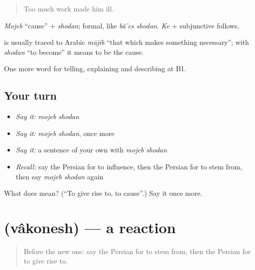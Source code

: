 \begin{quote}
Too much work made him ill.
\end{quote}

\emph{Mojeb} \textquotedblleft{}cause\textquotedblright{} + \emph{shodan}; formal, like \emph{bâ'es shodan}. \emph{Ke} + subjunctive follows.

\begin{cousinweb}
\textbf{} is usually traced to Arabic \emph{mūjib} \textquotedblleft{}that which makes something necessary\textquotedblright{}; with \emph{shodan} \textquotedblleft{}to become\textquotedblright{} it means to be the cause.
\end{cousinweb}

\begin{grammarlens}[title={What you've built}]
One more word for telling, explaining and describing at B1.
\end{grammarlens}

\subsection*{Your turn}
\begin{itemize}
\raggedright
  \item \emph{Say it:} \emph{mojeb shodan}
  \item \emph{Say it:} \emph{mojeb shodan}, once more
  \item \emph{Say it:} a sentence of your own with \emph{mojeb shodan}
  \item \emph{Recall:} say the Persian for to influence, then the Persian for to stem from, then say \emph{mojeb shodan} again
\end{itemize}

\begin{tcolorbox}[breakable,colback=teal!4,colframe=teal!35!black,title={Before you move on}]
What does   mean? (\textquotedblleft{}To give rise to, to cause\textquotedblright{}.) Say it once more.
\end{tcolorbox}
\section[\texorpdfstring{\fa{واکنش} (vâkonesh)}{واکنش (vâkonesh)}]{ (vâkonesh) — a reaction}

\label{lesson:FA-C372-vakonesh}



\begin{quote}
Before the new one: say the Persian for to stem from, then the Persian for to give rise to.
\end{quote}

